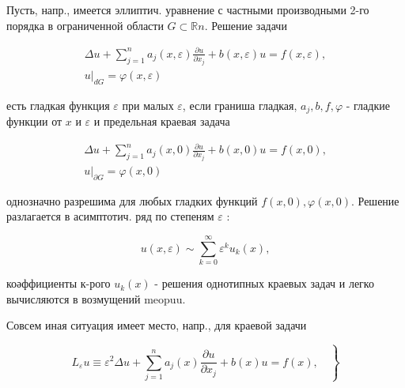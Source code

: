 \documentclass[10pt]{article}
\begin{document}
Пусть, напр., имеется эллиптич. уравнение с частными производными 2-го порядка в ограниченной области $G \subset \mathbb{R} n$. Решение задачи



\[

\begin{gathered}

\Delta u+\sum_{j=1}^{n} a_{j}(x, \varepsilon) \frac{\partial u}{\partial x_{j}}+b(x, \varepsilon) u=f(x, \varepsilon), \\

\left.u\right|_{d G}=\varphi(x, \varepsilon)

\end{gathered}

\]



есть гладкая функция $\varepsilon$ при малых $\varepsilon$, если граниша гладкая, $a_{j}, b, f, \varphi$ - гладкие функции от $x$ и $\varepsilon$ и предельная краевая задача



\[

\begin{gathered}

\Delta u+\sum_{j=1}^{n} a_{j}(x, 0) \frac{\partial u}{\partial x_{j}}+b(x, 0) u=f(x, 0), \\

\left.u\right|_{\partial G}=\varphi(x, 0)

\end{gathered}

\]



однозначно разрешима для любых гладких функций $f(x, 0), \varphi(x, 0)$. Решение разлагается в асимптотич. ряд по степеням $\varepsilon$ :



\[

u(x, \varepsilon) \sim \sum_{k=0}^{\infty} \varepsilon^{k} u_{k}(x),

\]



коәффициенты к-рого $u_{k}(x)$ - решения однотипных краевых задач и легко вычисляются в возмущений meopuu.



Совсем иная ситуация имеет место, напр., для краевой задачи



\[

\left.L_{\varepsilon} u \equiv \varepsilon^{2} \Delta u+\sum_{j=1}^{n} a_{j}(x) \frac{\partial u}{\partial x_{j}}+b(x) u=f(x), \quad\right\}

\]
\end{document}
